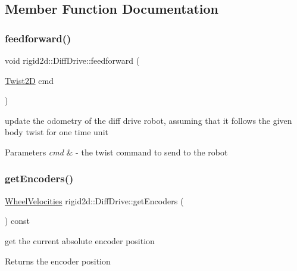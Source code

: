\subsection{Member Function Documentation}
\mbox{\label{classrigid2d_1_1DiffDrive_a09e8b9b8fe6539b75bb08f1b71242b7c}} 
\subsubsection{\texorpdfstring{feedforward()}{feedforward()}}
{\footnotesize\ttfamily void rigid2d\+::\+Diff\+Drive\+::feedforward (\begin{DoxyParamCaption}\item[{\hyperlink{structrigid2d_1_1Twist2D}{Twist2D}}]{cmd }\end{DoxyParamCaption})}



update the odometry of the diff drive robot, assuming that it follows the given body twist for one time unit 


\begin{DoxyParams}{Parameters}
{\em cmd} & -\/ the twist command to send to the robot \\
\hline
\end{DoxyParams}
\mbox{\label{classrigid2d_1_1DiffDrive_add7b4cb6d5e4edaffdcefbfa930a2f43}} 
\subsubsection{\texorpdfstring{get\+Encoders()}{getEncoders()}}
{\footnotesize\ttfamily \hyperlink{structrigid2d_1_1WheelVelocities}{Wheel\+Velocities} rigid2d\+::\+Diff\+Drive\+::get\+Encoders (\begin{DoxyParamCaption}{ }\end{DoxyParamCaption}) const}



get the current absolute encoder position 

\begin{DoxyReturn}{Returns}
the encoder position 
\end{DoxyReturn}
\mbox{\label{classrigid2d_1_1DiffDrive_a3af583df8981ddfb338bba07b7297ff2}} 
